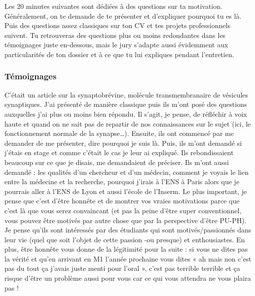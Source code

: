 Les 20 minutes suivantes sont dédiées à des questions sur ta motivation. Généralement, on te demande de te présenter et d’expliquer pourquoi tu es là. Puis des questions assez classiques sur ton CV et tes projets professionnels suivent. Tu retrouveras des questions plus ou moins redondantes dans les témoignages juste en-dessous, mais le jury s’adapte aussi évidemment aux particularités de ton dossier et à ce que tu lui expliques pendant l’entretien.

\subsubsection{Témoignages}

\lettrine{{\color{violet} \oldpilcrowfive}}{}
C’était un article sur la synaptobrévine, molécule transmembranaire de vésicules synaptiques. J’ai
présenté de manière classique puis ils m’ont posé des questions auxquelles j’ai plus ou moins bien
répondu. Il s’agit, je pense, de réfléchir à voix haute et quand on ne sait pas de repartir de nos
connaissances sur le sujet (ici, le fonctionnement normale de la synapse…).
Ensuite, ils ont commencé par me demander de me présenter, dire pourquoi je suis là. Puis, ils m’ont
demandé si j’étais en stage et comme c’était le cas je leur ai expliqué. Ils rebondissaient beaucoup
sur ce que je disais, me demandaient de préciser. Ils m’ont aussi demandé : les qualités d’un
chercheur et d’un médecin, comment je voyais le lien entre la médecine et la recherche, pourquoi
j’irais à l’ENS à Paris alors que je pourrais aller à l’ENS de Lyon et aussi l’école de l’Inserm.
Le plus important, je pense que c’est d’être honnête et de montrer vos vraies motivations parce que
c’est là que vous serez convaincant (et pas la peine d’être super conventionnel, vous pouvez être
motivés par autre chose que par la perspective d’être PU-PH). Je pense qu’ils sont intéressés par des
étudiants qui sont motivés/passionnés dans leur vie (quel que soit l’objet de cette passion -ou
presque) et enthousiastes. En plus, être honnête vous donne de la légitimité pour la suite : si vous ne
dites pas la vérité et qu’en arrivant en M1 l’année prochaine vous dites « ah mais non c’est pas du
tout ça j’avais juste menti pour l’oral », c’est pas terrible terrible et ça risque d’être un problème
aussi pour vous car ce qui vous attendra ne vous plaira pas !\\

